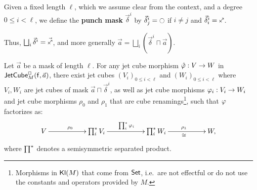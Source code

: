 \documentclass[a4paper]{memoir}
\begin{document}
\begin{definition}
	Given a fixed length $\ell$, which we assume clear from the context, and a degree $0 \leq i < \ell$, we define the \textbf{punch mask} $\vec \delta^i$ by $\vec \delta^i_j = \npolar$ if $i \neq j$ and $\vec \delta^i_i = \ypolar$.
\end{definition}
Thus, $\bigsqcup_i \vec \delta^i = \vec{\ypolar}$, and more generally $\vec a = \bigsqcup_i (\vec \delta^i \sqcap \vec a)$.
\begin{theorem} \label{sssfactorization}
	Let $\vec a$ be a mask of length $\ell$.
	For any jet cube morphism $\hat {\varphi} : V \to W$ in $\mathsf{JetCube}^{\Box}_{M}\mathopen{}\left( {\mathsf{f}},\vec a \right)\mathclose{}$, there exist jet cubes $(V_i)_{0 \leq i < \ell}$ and $(W_i)_{0 \leq i < \ell}$ where $V_i, W_i$ are jet cubes of mask $\vec a \sqcap \vec \delta^i$, as well as jet cube morphisms $\varphi_i : V_i \to W_i$ and jet cube morphisms $\rho_0$ and $\rho_1$ that are cube renamings\footnote{Morphisms in ${\mathsf{Kl}}(M)$ that come from ${\mathsf{Set}}$, i.e.\ are not effectful or do not use the constants and operators provided by $M$.}, such that $\varphi$ factorizes as:
	\[
		\xymatrix{
			V
				\ar[rr]^{\rho_0}
			&& {\bigasterisk_i V_i}
				\ar[rr]^{\bigasterisk_i \vfi_i}
			&& {\bigasterisk_i W_i}
				\ar[rr]^{\rho_1}_\cong
			&& W,
		}
	\]
	where $\prod^{*}$ denotes a semisymmetric separated product.
\end{theorem}
\end{document}
